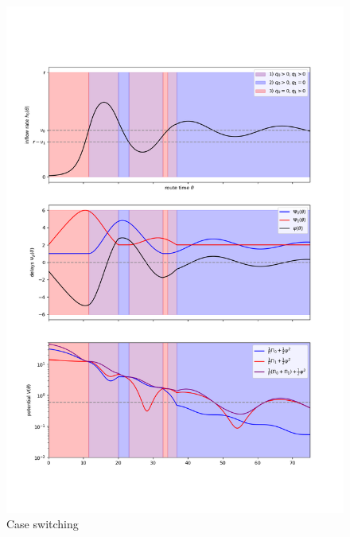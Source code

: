 \documentclass[10pt]{beamer}
\begin{document}
\begin{frame}
 
 		\begin{center}
		\begin{figure}
			
		\includegraphics[scale=0.25]{img/phases.png}
		\caption{Case switching}	
		\end{figure}	  
	\end{center}  
	
 
\end{frame}
\end{document}
